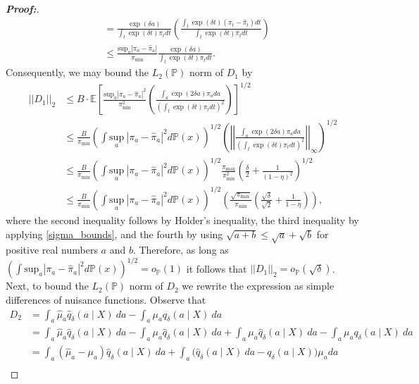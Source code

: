 \documentclass[11pt,twoside]{article}
\theoremstyle{definition}
\theoremstyle{remark}
\let\hat\widehat
\begin{document}
\begin{proof}[\textbf{Proof:}]
\begin{align*}
    &= \frac{\exp(\delta a)}{\int_t \exp(\delta t) \pi_t dt}\left(\frac{\int_t \exp(\delta t) (\pi_t - \hat{\pi}_t) dt}{\int_t \exp(\delta t) \hat{\pi}_t dt} \right) \\
&\leq \frac{\text{sup}_a |\pi_a - \hat{\pi}_a|}{\pi_{\min}} \frac{\exp(\delta a)}{\int_t \exp(\delta t) \pi_t dt}.
\end{align*}
Consequently, we may bound the $L_2(\mathbb{P})$ norm of $D_1$ by
\begin{align*}
    ||D_1||_2 &\leq B \cdot \mathbb{E} \left[\frac{\text{sup}_a |\pi_a - \hat{\pi}_a|^2}{\pi^2_{\min}}\left(\frac{\int_a \exp(2 \delta a) \pi_a da}{\left(\int_t \exp(\delta t) \pi_t dt\right)^2}  \right)\right]^{1/2} \\
    &\leq \frac{B}{\pi_{\min}} \left( \int \underset{a}{\text{sup}} \ |\pi_a - \hat{\pi}_a|^2 d\mathbb{P}(x) \right)^{1/2} \left( \left| \left| \frac{\int_a \exp(2 \delta a) \pi_a da}{\left(\int_t \exp(\delta t) \pi_t dt\right)^2} \right| \right|_\infty  \right)^{1/2} \\
    &\leq \frac{B}{\pi_{\min}} \left( \int \underset{a}{\text{sup}} \ |\pi_a - \hat{\pi}_a|^2 d\mathbb{P}(x) \right)^{1/2}  \frac{\pi_{\max}}{\pi^2_{\min}}\left(\frac{\delta}{2} +  \frac{1}{(1 - \eta)^2}\right)^{1/2} \\
    &\leq \frac{B}{\pi_{\min}} \left( \int \underset{a}{\text{sup}} \ |\pi_a - \hat{\pi}_a|^2 d\mathbb{P}(x) \right)^{1/2} \left(\frac{\sqrt{\pi_{\max}}}{\pi_{\min}}\left(\frac{\sqrt{\delta}}{\sqrt{2}} + \frac{1}{1 - \eta}  \right)  \right),
\end{align*}
where the second inequality follows by Holder's inequality, the third inequality by applying \cref{sigma_bounds}, and the fourth by using $\sqrt{a + b} \leq \sqrt{a} + \sqrt{b}$ for positive real numbers $a$ and $b$. Therefore, as long as $( \int \text{sup}_a  |\pi_a - \hat{\pi}_a|^2 d\mathbb{P}(x))^{1/2} = o_\mathbb{P}(1)$ it follows that $||D_1||_2 = o_\mathbb{P}(\sqrt{\delta})$. Next, to bound the $L_2(\mathbb{P})$ norm of $D_2$ we rewrite the expression as simple differences of nuisance functions. Observe that
\begin{align*}
   D_2 &=  \int_a \hat{\mu}_a \hat{q}_\delta(a \mid X) \ da - \int_a \mu_a q_\delta(a \mid X) \ da \\
   &= \int_a \hat{\mu}_a \hat{q}_\delta(a \mid X) \ da - \int_a \mu_a \hat{q}_\delta(a \mid X) \ da + \int_a \mu_a \hat{q}_\delta(a \mid X) \ da - \int_a \mu_a q_\delta(a \mid X) \ da \\
   &= \int_a (\hat{\mu}_a - \mu_a) \hat{q}_\delta(a \mid X) \ da  + \int_a  \big(\hat{q}_\delta(a \mid X) \ da -  q_\delta(a \mid X)\big)\mu_a da \\

\end{align*}
\end{proof}
\end{document}
